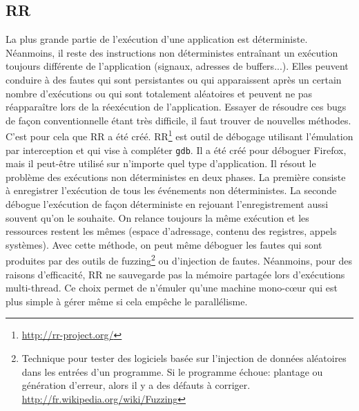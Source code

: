 \subsection{RR}
\label{subsection:RR}

La plus grande partie de l'exécution d'une application est
déterministe. Néanmoins, il reste des instructions non déterministes entraînant
un exécution toujours différente de l'application (signaux, adresses de
buffers...). Elles peuvent conduire à des fautes qui sont persistantes ou qui
apparaissent après un certain nombre d'exécutions ou qui sont totalement
aléatoires et peuvent ne pas réapparaître lors de la réexécution de
l'application. Essayer de résoudre ces bugs de façon conventionnelle étant très
difficile, il faut trouver de nouvelles méthodes. C'est pour cela que RR a été
créé. RR\footnote{\url{http://rr-project.org/}} est outil de débogage utilisant l'émulation par interception
et qui vise à compléter \texttt{gdb}. Il a été créé pour déboguer Firefox, mais il
peut-être utilisé sur n'importe quel type d'application. Il résout le problème
des exécutions non déterministes en deux phases. La première consiste à
enregistrer l'exécution de tous les événements non déterministes. La seconde
débogue l'exécution de façon déterministe en rejouant l'enregistrement aussi
souvent qu'on le souhaite. On relance toujours la même exécution et les
ressources restent les mêmes (espace d'adressage, contenu des registres, appels
systèmes). Avec cette méthode, on peut même déboguer les fautes qui sont
produites par des outils de fuzzing\footnote{ Technique pour tester des
  logiciels basée sur l'injection de données aléatoires dans les entrées d'un
  programme. Si le programme échoue: plantage ou génération d'erreur, alors il y
  a des défauts à corriger. \\ \url{http://fr.wikipedia.org/wiki/Fuzzing}} ou
d'injection de fautes. Néanmoins, pour des raisons d'efficacité, RR ne sauvegarde
pas la mémoire partagée lors d'exécutions multi-thread. Ce choix permet de
n'émuler qu'une machine mono-c\oe ur qui est plus simple à gérer même si cela
empêche le parallélisme.

